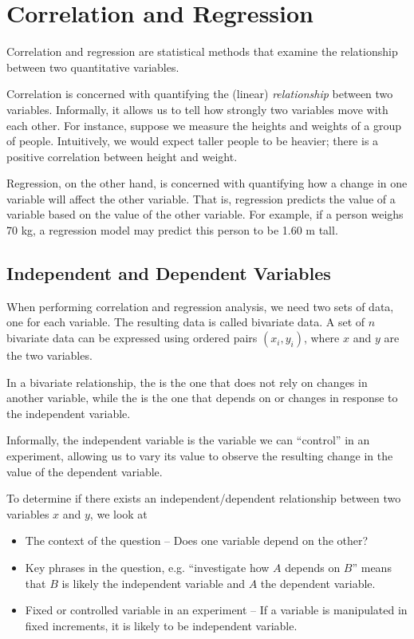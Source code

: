 \chapter{Correlation and Regression}

Correlation and regression are statistical methods that examine the relationship between two quantitative variables.

Correlation is concerned with quantifying the (linear) \emph{relationship} between two variables. Informally, it allows us to tell how strongly two variables move with each other. For instance, suppose we measure the heights and weights of a group of people. Intuitively, we would expect taller people to be heavier; there is a positive correlation between height and weight.

Regression, on the other hand, is concerned with quantifying how a change in one variable will affect the other variable. That is, regression predicts the value of a variable based on the value of the other variable. For example, if a person weighs 70 kg, a regression model may predict this person to be 1.60 m tall.

\section{Independent and Dependent Variables}

When performing correlation and regression analysis, we need two sets of data, one for each variable. The resulting data is called bivariate data. A set of $n$ bivariate data can be expressed using ordered pairs $(x_i, y_i)$, where $x$ and $y$ are the two variables.

\begin{definition}
    In a bivariate relationship, the  is the one that does not rely on changes in another variable, while the  is the one that depends on or changes in response to the independent variable.
\end{definition}

Informally, the independent variable is the variable we can ``control'' in an experiment, allowing us to vary its value to observe the resulting change in the value of the dependent variable.

\begin{recipe}
    To determine if there exists an independent/dependent relationship between two variables $x$ and $y$, we look at
    \begin{itemize}
        \item The context of the question -- Does one variable depend on the other?
        \item Key phrases in the question, e.g. ``investigate how $A$ depends on $B$'' means that $B$ is likely the independent variable and $A$ the dependent variable.
        \item Fixed or controlled variable in an experiment -- If a variable is manipulated in fixed increments, it is likely to be independent variable.
    \end{itemize}
\end{recipe}

